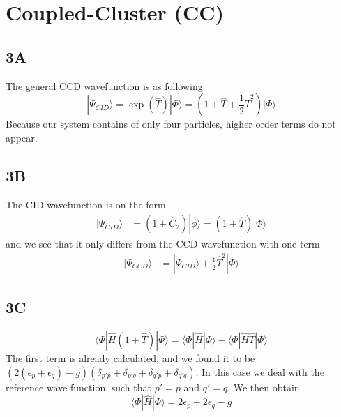 \documentclass[norsk,a4paper,12pt]{article}
\begin{document}
\newpage
\section{Coupled-Cluster (CC)}
\subsection*{3A}
The general CCD wavefunction is as following
\begin{equation}
|\Psi_{CID}\rangle=\exp{(\hat{T})}|\Phi\rangle=(1+\hat{T}+\frac{1}{2}\hat{T}^2)|\Phi\rangle
\end{equation}
Because our system contains of only four particles, higher order terms do not appear. 

\subsection*{3B}
The CID wavefunction is on the form
\begin{align}
|\Psi_{CID}\rangle&=(1+\hat{C}_2)|\phi\rangle=(1+\hat{T})|\Phi\rangle
\end{align}
and we see that it only differs from the CCD wavefunction with one term
\begin{align*}
|\Psi_{CCD}\rangle&=|\Psi_{CID}\rangle+\frac{1}{2}\hat{T}^2|\Phi\rangle
\end{align*}

\subsection*{3C}
\begin{equation*}
\langle \Phi|\hat{H}(1+\hat{T})|\Phi\rangle=\langle \Phi|\hat{H}|\Phi\rangle+\langle \Phi|\hat{H}\hat{T}|\Phi\rangle
\end{equation*}
The first term is already calculated, and we found it to be $(2(\epsilon_p+\epsilon_q)-g)(\delta_{p'p}+\delta_{p'q}+\delta_{q'p}+\delta_{q'q})$. In this case we deal with the reference wave function, such that $p'=p$ and $q'=q$. We then obtain
\begin{equation*}
\langle \Phi|\hat{H}|\Phi\rangle=2\epsilon_p+2\epsilon_q-g
\end{equation*}
\end{document}
